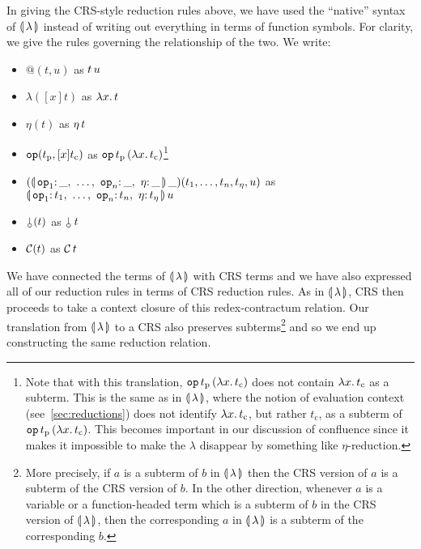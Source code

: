 In giving the CRS-style reduction rules above, we have used the ``native''
syntax of $\llparenthesis \, \lambda \, \rrparenthesis$ instead of writing out everything in terms of
function symbols. For clarity, we give the rules governing the relationship
of the two. We write:

\begin{itemize}
\item $@(t,u)$ as $t\,u$
\item $\lambda([x]t)$ as $\lambda x.\, t$
\item $\eta(t)$ as $\eta\,t$
\item $\mathtt{op}(t_{\mathrm{p}},[x]t_{\mathrm{c}})$ as
  $\mathtt{op}\,t_{\mathrm{p}}\,(\lambda x.\, t_{\mathrm{c}})$\footnote{Note
    that with this translation,
    $\mathtt{op}\,t_{\mathrm{p}}\,(\lambda x.\, t_{\mathrm{c}})$ does not
    contain $\lambda x.\, t_{\mathrm{c}}$ as a subterm. This is the same as in
    $\llparenthesis \, \lambda \, \rrparenthesis$, where the notion of evaluation context
    (see~\ref{sec:reductions}) does not identify $\lambda x.\, t_{\mathrm{c}}$,
    but rather $t_{\mathrm{c}}$, as a subterm of
    $\mathtt{op}\,t_{\mathrm{p}}\,(\lambda x.\, t_{\mathrm{c}})$. This
    becomes important in our discussion of confluence since it makes it
    impossible to make the $\lambda$ disappear by something like
    $\eta$-reduction.}
\item
  $(\ap{\banana{\onto{\op{op}_1}{\_},\ \ldots,\ \onto{\op{op}_n}{\_},\ \onto{\eta}{\_}}}{\_})(t_1,\ldots,t_n,t_\eta,u)$
  as $\ap{\banana{\onto{\op{op}_1}{t_1},\ \ldots,\ \onto{\op{op}_n}{t_n},\ \onto{\eta}{t_\eta}}}{u}$
\item $\cherry(t)$ as $\ap{\cherry}{t}$
\item $\mathcal{C}(t)$ as $\mathcal{C}\,t$
\end{itemize}

We have connected the terms of $\llparenthesis \, \lambda \, \rrparenthesis$ with CRS terms and we
have also expressed all of our reduction rules in terms of CRS reduction
rules. As in $\llparenthesis \, \lambda \, \rrparenthesis$, CRS then proceeds to take a context
closure of this redex-contractum relation. Our translation from
$\llparenthesis \, \lambda \, \rrparenthesis$ to a CRS also preserves subterms\footnote{More
  precisely, if $a$ is a subterm of $b$ in $\llparenthesis \, \lambda \, \rrparenthesis$ then the CRS
  version of $a$ is a subterm of the CRS version of $b$. In the other
  direction, whenever $a$ is a variable or a function-headed term which is
  a subterm of $b$ in the CRS version of $\llparenthesis \, \lambda \, \rrparenthesis$, then the
  corresponding $a$ in $\llparenthesis \, \lambda \, \rrparenthesis$ is a subterm of the corresponding
  $b$.}  and so we end up constructing the same reduction relation.


